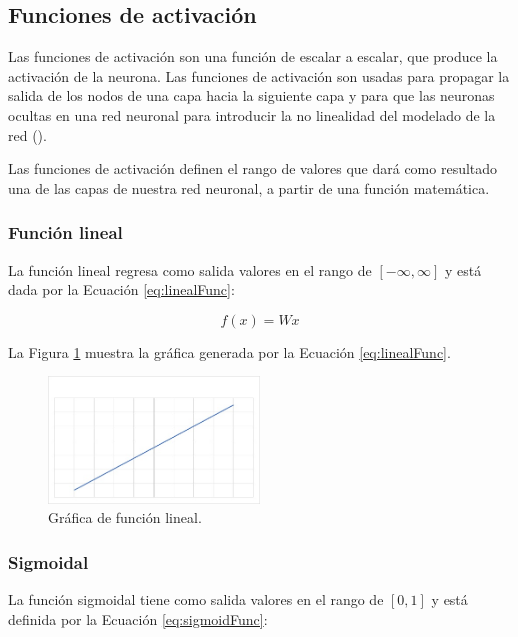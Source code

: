 \subsection{Funciones de activación}

Las funciones de activación son una función de escalar a escalar, que produce la activación de la neurona. Las funciones de activación son usadas para propagar la salida de los nodos de una capa hacia la siguiente capa y para que las neuronas ocultas en una red neuronal para introducir la no linealidad del modelado de la red (\cite{patterson2017deep}).


Las funciones de activación definen el rango de valores que dará como resultado una de las capas de nuestra red neuronal, a partir de una función matemática.

\subsubsection{Función lineal}

La función lineal regresa como salida valores en el rango de $[-\infty,\infty]$ y está dada por la Ecuación \ref{eq:linealFunc}:

\begin{equation}
\label{eq:linealFunc}
    f(x) = Wx
\end{equation}

La Figura \ref{fig:graficaLineal} muestra la gráfica generada por la Ecuación \ref{eq:linealFunc}.

\begin{figure}[H]
    \centering
    \includegraphics[width=0.5\textwidth]{MarcoTeorico/imgs/GraficaLineal.jpg}
    \caption{Gráfica de función lineal.}
    \label{fig:graficaLineal}
\end{figure}

\subsubsection{Sigmoidal}

La función sigmoidal tiene como salida valores en el rango de $[0,1]$ y está definida por la Ecuación \ref{eq:sigmoidFunc}:

